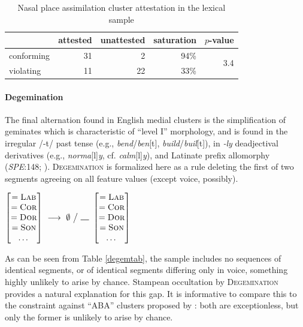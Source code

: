 \begin{table}[ht]
\centering
\begin{tabular}{l rrrr}
\toprule
           & attested & unattested & saturation & $p$-value \\
\midrule
conforming & 31       & 2          & 94\%       & \multirow{2}{*}{3.4\e{-07}} \\
violating  & 11       & 22         & 33\%       \\
\bottomrule
\end{tabular}
\caption{Nasal place assimilation cluster attestation in the lexical sample}
\label{npatab}
\end{table}

\paragraph{Degemination} 
The final alternation found in English medial clusters is the simplification of geminates which is characteristic of ``level I'' morphology, and is found in the irregular /-t/ past tense (e.g., \emph{bend}/\emph{ben}[t], \emph{build}/\emph{buil}[t]), in \emph{-ly} deadjectival derivatives (e.g., \emph{norma}[l]\emph{y}, cf. \emph{calm}[l]\emph{y}), and Latinate prefix allomorphy (\emph{SPE}:148; \citealt[102]{Borowsky1986}). \textsc{Degemination} is formalized here as a rule deleting the first of two segments agreeing on all feature values (except voice, possibly).
\label{degemx}

\begin{example}
$\begin{bmatrix} =\textsc{Lab} \\ =\textsc{Cor} \\ =\textsc{Dor} \\ =\textsc{Son} \\ \ldots{} \end{bmatrix}~\goesto~\emptyset~\big /~\gap~\begin{bmatrix} =\textsc{Lab} \\ =\textsc{Cor} \\ =\textsc{Dor} \\ =\textsc{Son} \\ \ldots{} \end{bmatrix}$
\end{example}

\noindent
As can be seen from Table \ref{degemtab}, the sample includes no sequences of identical segments, or of identical segments differing only in voice, something highly unlikely to arise by chance.
Stampean occultation by \textsc{Degemination} provides a natural explanation for this gap.
It is informative to compare this to the constraint against ``ABA'' clusters proposed by \citeauthor{Pierrehumbert1994}: both are exceptionless, but only the former is unlikely to arise by chance.

